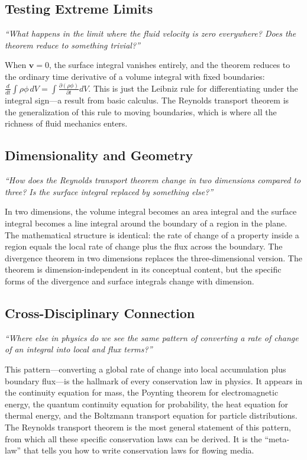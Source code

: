 \subsection*{Testing Extreme Limits}
\textit{``What happens in the limit where the fluid velocity is zero everywhere? Does the theorem reduce to something trivial?''}

When $\mathbf{v} = 0$, the surface integral vanishes entirely, and the theorem reduces to the ordinary time derivative of a volume integral with fixed boundaries: $\frac{d}{dt}\int\rho\phi\,dV = \int\frac{\partial(\rho\phi)}{\partial t}dV$. This is just the Leibniz rule for differentiating under the integral sign---a result from basic calculus. The Reynolds transport theorem is the generalization of this rule to moving boundaries, which is where all the richness of fluid mechanics enters.

\subsection*{Dimensionality and Geometry}
\textit{``How does the Reynolds transport theorem change in two dimensions compared to three? Is the surface integral replaced by something else?''}

In two dimensions, the volume integral becomes an area integral and the surface integral becomes a line integral around the boundary of a region in the plane. The mathematical structure is identical: the rate of change of a property inside a region equals the local rate of change plus the flux across the boundary. The divergence theorem in two dimensions replaces the three-dimensional version. The theorem is dimension-independent in its conceptual content, but the specific forms of the divergence and surface integrals change with dimension.

\subsection*{Cross-Disciplinary Connection}
\textit{``Where else in physics do we see the same pattern of converting a rate of change of an integral into local and flux terms?''}

This pattern---converting a global rate of change into local accumulation plus boundary flux---is the hallmark of every conservation law in physics. It appears in the continuity equation for mass, the Poynting theorem for electromagnetic energy, the quantum continuity equation for probability, the heat equation for thermal energy, and the Boltzmann transport equation for particle distributions. The Reynolds transport theorem is the most general statement of this pattern, from which all these specific conservation laws can be derived. It is the ``meta-law'' that tells you how to write conservation laws for flowing media.

